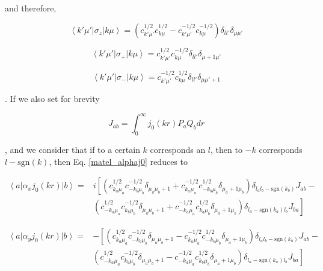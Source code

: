 \documentclass[]{report}
\newcommand{\bra}[1]{\left<#1\right|}
\newcommand{\ket}[1]{\left|#1\right>}
\newcommand{\braket}[3]{\bra{#1}#2\ket{#3}}
\begin{document}
and therefore,

\begin{equation}\label{matel_sz}
\braket{k'\mu'}{\sigma_z}{k\mu} = \left(c_{k'\mu'}^{1/2}c_{k\mu}^{1/2}-c_{k'\mu'}^{-1/2}c_{k\mu}^{-1/2}\right)\delta_{ll'}\delta_{\mu\mu'}
\end{equation}

\begin{equation}\label{matel_sp}
\braket{k'\mu'}{\sigma_+}{k\mu} = c_{k'\mu'}^{1/2} c_{k\mu}^{-1/2}\delta_{ll'}\delta_{\mu+1\mu'}
\end{equation}

\begin{equation}\label{matel_sm}
\braket{k'\mu'}{\sigma_-}{k\mu} = c_{k'\mu'}^{-1/2} c_{k\mu}^{1/2}\delta_{ll'}\delta_{\mu\mu'+1}
\end{equation}

. If we also set for brevity

\begin{equation}\label{pq_ints}
J_{ab} = \int_{0}^{\infty}j_0(kr)P_aQ_b dr
\end{equation}

, and we consider that if to a certain $k$ corresponds an $l$, then to $-k$ corresponds $l-\mathrm{sgn}(k)$, then Eq. \ref{matel_alphaj0} reduces to

\begin{align}\label{matel_alphaxj0}
\braket{a}{\alpha_xj_0(kr)}{b} = & i\left[\left(c_{k_a\mu_a}^{1/2} c_{-k_b\mu_b}^{-1/2}\delta_{\mu_a\mu_b+1}
+ c_{k_a\mu_a}^{-1/2} c_{-k_b\mu_b}^{1/2}\delta_{\mu_a+1\mu_b}\right)
\delta_{l_al_b-\mathrm{sgn}(k_b)} J_{ab}  - \right. \\
&\left. 
\left(c_{-k_a\mu_a}^{1/2} c_{k_b\mu_b}^{-1/2}\delta_{\mu_a\mu_b+1}
+ c_{-k_a\mu_a}^{-1/2} c_{k_b\mu_b}^{1/2}\delta_{\mu_a+1\mu_b}\right)
\delta_{l_a-\mathrm{sgn}(k_a)l_b} J_{ba} 
\right] \nonumber
\end{align}

\begin{align}\label{matel_alphayj0}
\braket{a}{\alpha_yj_0(kr)}{b} = & -\left[\left(c_{k_a\mu_a}^{1/2} c_{-k_b\mu_b}^{-1/2}\delta_{\mu_a\mu_b+1}
- c_{k_a\mu_a}^{-1/2} c_{-k_b\mu_b}^{1/2}\delta_{\mu_a+1\mu_b}\right)
\delta_{l_al_b-\mathrm{sgn}(k_b)} J_{ab}  - \right. \\
&\left. 
\left(c_{-k_a\mu_a}^{1/2} c_{k_b\mu_b}^{-1/2}\delta_{\mu_a\mu_b+1}
- c_{-k_a\mu_a}^{-1/2} c_{k_b\mu_b}^{1/2}\delta_{\mu_a+1\mu_b}\right)
\delta_{l_a-\mathrm{sgn}(k_a)l_b} J_{ba} 
\right] \nonumber
\end{align}
\end{document}
